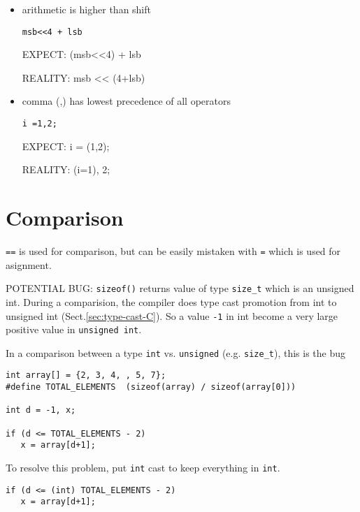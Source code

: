 \begin{itemize}
   \item arithmetic is higher than shift
\begin{verbatim}
msb<<4 + lsb
\end{verbatim}
\begin{minipage}[t]{0.5\textwidth}
EXPECT: (msb<<4) + lsb
\end{minipage} 
\begin{minipage}[t]{0.5\textwidth}
REALITY: msb << (4+lsb)
\end{minipage} 

  \item comma (,) has lowest precedence of all operators
\begin{verbatim}
i =1,2;
\end{verbatim}
\begin{minipage}[t]{0.5\textwidth}
EXPECT: i = (1,2);
\end{minipage} 
\begin{minipage}[t]{0.5\textwidth}
REALITY: (i=1), 2;
\end{minipage} 

\end{itemize}


\section{Comparison}
\label{sec:math_comparison}

\verb!==! is used for comparison, but can be easily mistaken with \verb!=! which
is used for asignment.

POTENTIAL BUG: \verb!sizeof()! returns value of type \verb!size_t! which is an
unsigned int. During a comparision, the compiler does type cast promotion from
int to unsigned int (Sect.\ref{sec:type-cast-C}). So a value \verb!-1! in int
become a very large positive value in \verb!unsigned int!.

In a comparison between a type \verb!int! vs. \verb!unsigned! (e.g.
\verb!size_t!), this is the bug
\begin{verbatim}
int array[] = {2, 3, 4, , 5, 7};
#define TOTAL_ELEMENTS  (sizeof(array) / sizeof(array[0]))

int d = -1, x;

if (d <= TOTAL_ELEMENTS - 2) 
   x = array[d+1];
\end{verbatim}
To resolve this problem, put \verb!int! cast to keep everything in \verb!int!.
\begin{verbatim}
if (d <= (int) TOTAL_ELEMENTS - 2) 
   x = array[d+1];
\end{verbatim}

